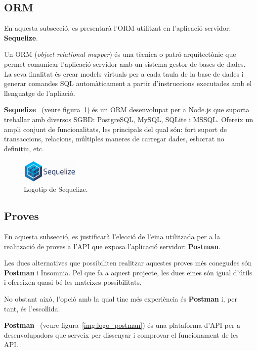 \documentclass[a4paper,12pt]{ThesisStyle}
\begin{document}
\subsection{ORM}
\label{subsec:decisions_servidor_orm}

En aquesta subsecció, es presentarà l'ORM utilitzat en l'aplicació servidor: \textbf{Sequelize}.

Un ORM (\textit{object relational mapper}) és una tècnica o patró arquitectònic que permet comunicar l'aplicació servidor amb un sistema gestor de bases de dades. La seva finalitat és crear models virtuals per a cada taula de la base de dades i generar comandes SQL automàticament a partir d'instruccions executades amb el llenguatge de l'apliació.

\textbf{Sequelize}~\cite{Sequelize} (veure figura~\ref{img:logo_sequelize}) és un ORM desenvolupat per a Node.js que suporta treballar amb diversos SGBD: PostgreSQL, MySQL, SQLite i MSSQL. Ofereix un ampli conjunt de funcionalitats, les principals del qual són: fort suport de transaccions, relacions, múltiples maneres de carregar dades, esborrat no definitiu, etc.

\begin{figure}[H]
  \centering
  \includegraphics[width=0.25\textwidth]{assets/logos/Sequelize.png}
  \caption{\label{img:logo_sequelize}Logotip de Sequelize.}
\end{figure}

\subsection{Proves}
\label{subsec:decisions_servidor_proves}

En aquesta subsecció, es justificarà l'elecció de l'eina utilitzada per a la realització de proves a l'API que exposa l'aplicació servidor: \textbf{Postman}.

Les dues alternatives que possibiliten realitzar aquestes proves més conegudes són \textbf{Postman} i Insomnia. Pel que fa a aquest projecte, les dues eines són igual d'útils i ofereixen quasi bé les mateixes possibilitats.

No obstant això, l'opció amb la qual tinc més experiència és \textbf{Postman} i, per tant, és l'escollida.

\textbf{Postman}~\cite{Postman} (veure figura~\ref{img:logo_postman}) és una plataforma d'API per a desenvolupadors que serveix per dissenyar i comprovar el funcionament de les API.
\end{document}
